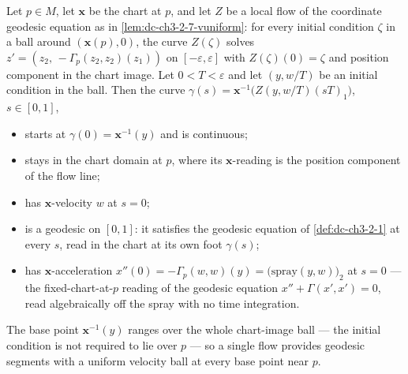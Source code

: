 \begin{lemma}
  \label{lem:dc-ch3-3-7-descent}
  \leanok
  Let $p\in M$, let $\mathbf{x}$ be the chart at $p$, and let $Z$ be a local flow
  of the coordinate geodesic equation as in \cref{lem:dc-ch3-2-7-vuniform}: for
  every initial condition $\zeta$ in a ball around $(\mathbf{x}(p),0)$, the curve
  $Z(\zeta)$ solves $z'=(z_2,\,-\Gamma_p(z_2,z_2)(z_1))$ on
  $[-\varepsilon,\varepsilon]$ with $Z(\zeta)(0)=\zeta$ and position component in
  the chart image. Let $0<T<\varepsilon$ and let $(y,w/T)$ be an initial
  condition in the ball. Then the curve
  $\gamma(s)=\mathbf{x}^{-1}\bigl(Z(y,w/T)(sT)_1\bigr)$, $s\in[0,1]$,

  \begin{itemize}
  \item starts at $\gamma(0)=\mathbf{x}^{-1}(y)$ and is continuous;
  \item stays in the chart domain at $p$, where its $\mathbf{x}$-reading is the
    position component of the flow line;
  \item has $\mathbf{x}$-velocity $w$ at $s=0$;
  \item is a geodesic on $[0,1]$: it satisfies the geodesic equation of
    \cref{def:dc-ch3-2-1} at every $s$, read in the chart at its own foot
    $\gamma(s)$;
  \item has $\mathbf{x}$-acceleration
    $x''(0)=-\Gamma_p(w,w)(y)=\bigl(\mathrm{spray}(y,w)\bigr)_2$ at $s=0$ — the
    fixed-chart-at-$p$ reading of the geodesic equation $x''+\Gamma(x',x')=0$,
    read algebraically off the spray with no time integration.
  \end{itemize}

  The base point $\mathbf{x}^{-1}(y)$ ranges over the whole chart-image ball —
  the initial condition is not required to lie over $p$ — so a single flow
  provides geodesic segments with a uniform velocity ball at every base point
  near $p$.
\end{lemma}
